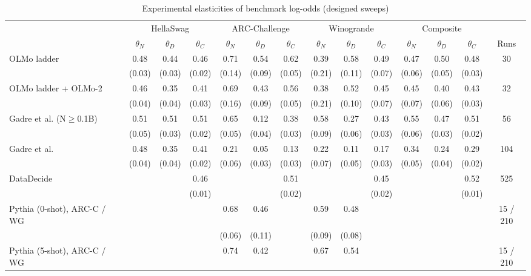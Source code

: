 \begin{table}[!htbp]
\centering
\scriptsize
\begin{threeparttable}
\caption{Experimental elasticities of benchmark log-odds (designed sweeps)}
\label{tab:m4_exp_benchmarks}
\begin{tabular}{lccccccccccccc}
\toprule
\multicolumn{1}{c}{} & \multicolumn{3}{c}{HellaSwag} & \multicolumn{3}{c}{ARC-Challenge} & \multicolumn{3}{c}{Winogrande} & \multicolumn{3}{c}{Composite} & \\ \cmidrule(lr){2-4}\cmidrule(lr){5-7}\cmidrule(lr){8-10}\cmidrule(lr){11-13}
 & $\theta_N$ & $\theta_D$ & $\theta_C$ & $\theta_N$ & $\theta_D$ & $\theta_C$ & $\theta_N$ & $\theta_D$ & $\theta_C$ & $\theta_N$ & $\theta_D$ & $\theta_C$ & Runs \\
\midrule
OLMo ladder & 0.48 & 0.44 & 0.46 & 0.71 & 0.54 & 0.62 & 0.39 & 0.58 & 0.49 & 0.47 & 0.50 & 0.48 & 30 \\
 & (0.03) & (0.03) & (0.02) & (0.14) & (0.09) & (0.05) & (0.21) & (0.11) & (0.07) & (0.06) & (0.05) & (0.03) &  \\
OLMo ladder + OLMo-2 & 0.46 & 0.35 & 0.41 & 0.69 & 0.43 & 0.56 & 0.38 & 0.52 & 0.45 & 0.45 & 0.40 & 0.43 & 32 \\
 & (0.04) & (0.04) & (0.03) & (0.16) & (0.09) & (0.05) & (0.21) & (0.10) & (0.07) & (0.07) & (0.06) & (0.03) &  \\
Gadre et al. (N$\geq$0.1B) & 0.51 & 0.51 & 0.51 & 0.65 & 0.12 & 0.38 & 0.58 & 0.27 & 0.43 & 0.55 & 0.47 & 0.51 & 56 \\
 & (0.05) & (0.03) & (0.02) & (0.05) & (0.04) & (0.03) & (0.09) & (0.06) & (0.03) & (0.06) & (0.03) & (0.02) &  \\
Gadre et al. & 0.48 & 0.35 & 0.41 & 0.21 & 0.05 & 0.13 & 0.22 & 0.11 & 0.17 & 0.34 & 0.24 & 0.29 & 104 \\
 & (0.04) & (0.04) & (0.02) & (0.06) & (0.03) & (0.03) & (0.07) & (0.05) & (0.03) & (0.05) & (0.04) & (0.02) &  \\
DataDecide &  &  & 0.46 &  &  & 0.51 &  &  & 0.45 &  &  & 0.52 & 525 \\
 &  &  & (0.01) &  &  & (0.02) &  &  & (0.02) &  &  & (0.01) &  \\
\midrule
Pythia (0-shot), ARC-C / WG &  &  &  & 0.68 & 0.46 &  & 0.59 & 0.48 &  &  &  &  & 15 / 210 \\
 &  &  &  & (0.06) & (0.11) &  & (0.09) & (0.08) &  &  &  &  &  \\
Pythia (5-shot), ARC-C / WG &  &  &  & 0.74 & 0.42 &  & 0.67 & 0.54 &  &  &  &  & 15 / 210 \\

\end{tabular}
\end{threeparttable}
\end{table}
